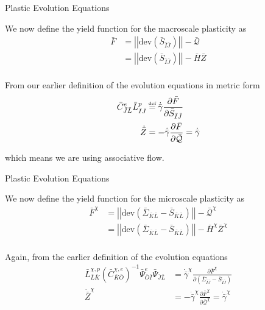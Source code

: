 \documentclass[11pt]{beamer}
\newcommand\defeq{\mathrel{\stackrel{\makebox[0pt]{\mbox{\normalfont\tiny def}}}{=}}}
\newcommand{\LTN}[1]{\left|\left| #1 \right|\right|}
\newcommand{\dev}[1]{\text{dev}\left(#1\right)}
\begin{document}
\begin{frame}{Plastic Evolution Equations}

We now define the yield function for the macroscale plasticity as
\begin{align*}
\bar{F} &= \LTN{\dev{\bar{S}_{\bar{I}\bar{J}}}} - \bar{\mathcal{Q}}\\
&= \LTN{\dev{\bar{S}_{\bar{I}\bar{J}}}} - \bar{H} \bar{Z}\\
\end{align*}

From our earlier definition of the evolution equations in metric form
\begin{align*}
\bar{C}_{\bar{J}\bar{L}}^e\bar{L}_{\bar{I}\bar{J}}^p &\defeq \dot{\bar{\gamma}} \frac{\partial \bar{F}}{\partial \bar{S}_{\bar{I}\bar{J}}}\\
\dot{\bar{Z}} &= -\dot{\bar{\gamma}} \frac{\partial \bar{F}}{\partial \bar{\mathcal{Q}}} = \dot{\bar{\gamma}}\\
\end{align*}

which means we are using associative flow.

\end{frame}

\begin{frame}{Plastic Evolution Equations}

We now define the yield function for the microscale plasticity as
\begin{align*}
\bar{F}^{\chi} &= \LTN{\dev{\bar{\Sigma}_{\bar{K}\bar{L}} - \bar{S}_{\bar{K}\bar{L}}}} - \bar{\mathcal{Q}}^{\chi}\\
&= \LTN{\dev{\bar{\Sigma}_{\bar{K}\bar{L}} - \bar{S}_{\bar{K}\bar{L}}}} - \bar{H}^{\chi} \bar{Z}^{\chi}\\
\end{align*}

Again, from the earlier definition of the evolution equations
\begin{align*}
\bar{L}_{\bar{L}\bar{K}}^{\chi,p} \left(\bar{C}_{\bar{K}\bar{O}}^{\chi,e}\right)^{-1} \bar{\Psi}_{\bar{O}\bar{I}}^e\bar{\Psi}_{\bar{J}\bar{L}} &= \dot{\bar{\gamma}}^{\chi} \frac{\partial \bar{F}^{\chi}}{\partial \left(\bar{\Sigma}_{\bar{I}\bar{J}} - \bar{S}_{\bar{I}\bar{J}}\right)}\\
\dot{\bar{Z}}^{\chi} &= -\dot{\bar{\gamma}}^{\chi} \frac{\partial \bar{F}^{\chi}}{\partial \bar{\mathcal{Q}}^{\chi}} = \dot{\bar{\gamma}}^{\chi}\\
\end{align*}

\end{frame}
\end{document}
